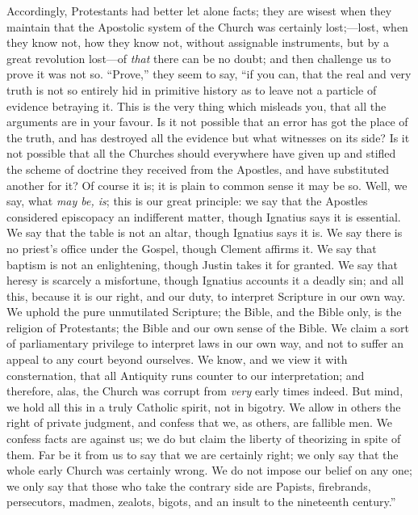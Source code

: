 Accordingly, Protestants had better let alone facts; they are
wisest when they maintain that the Apostolic system of the Church was
certainly lost;—lost, when they know not, how they know not, without
assignable instruments, but by a great revolution lost—of \emph{that}
there can be no doubt; and then challenge us to prove it was not so.
``Prove,'' they seem to say, ``if you can, that the real
and very truth is not so entirely hid in primitive history as to leave
not a particle of evidence betraying it. This is the very thing
which misleads you, that all the arguments are in your favour. Is it
not possible that an error has got the place of the truth, and has
destroyed all the evidence but what witnesses on its side? Is it not
possible that all the Churches should everywhere have given up and
stifled the scheme of doctrine they received from the Apostles, and
have substituted another for it? Of course it is; it is plain to
common sense it may be so. Well, we say, what \emph{may be, is}; this
is our great principle: we say that the Apostles considered episcopacy
an indifferent matter, though Ignatius says it is essential. We say
that the table is not an altar, though Ignatius says it is. We say
there is no priest's office under the Gospel, though Clement affirms
it. We say that baptism is not an enlightening, though Justin takes it
for granted. We say that heresy is scarcely a misfortune, though
Ignatius accounts it a deadly sin; and all this, because it is our
right, and our duty, to interpret Scripture in our own way. We uphold
the pure unmutilated Scripture; the Bible, and the Bible only, is the
religion of Protestants; the Bible and our own sense of the Bible. We
claim a sort of parliamentary privilege to interpret laws in our own
way, and not to suffer an appeal to any court beyond ourselves. We
know, and we view it with consternation, that all Antiquity runs
counter to our interpretation; and therefore, alas, the Church was
corrupt from \emph{very} early times indeed. But mind, we hold all
this in a truly Catholic spirit, not in bigotry. We allow in others
the right of private judgment, and confess that we, as others, are
fallible men. We confess facts are against us; we do but claim the
liberty of theorizing in spite of them. Far be it from us to say that
we are certainly right; we only say that the whole early Church was
certainly wrong. We do not impose our belief on any one; we only
say that those who take the contrary side are Papists, firebrands,
persecutors, madmen, zealots, bigots, and an insult to the nineteenth
century.''

